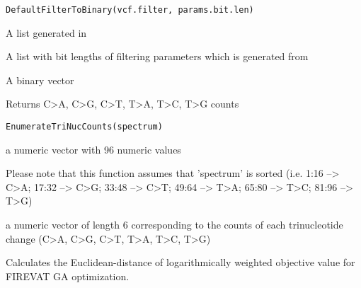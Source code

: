 \documentclass[letterpaper]{book}
\begin{document}
%
\begin{Usage}
\begin{verbatim}
DefaultFilterToBinary(vcf.filter, params.bit.len)
\end{verbatim}
\end{Usage}
%
\begin{Arguments}
\begin{ldescription}
\item[\code{vcf.filter}] A list generated in 

\item[\code{params.bit.len}] A list with bit lengths of filtering parameters which is generated from 
\end{ldescription}
\end{Arguments}
%
\begin{Value}
A binary vector
\end{Value}
%
\begin{Description}\relax
Returns C>A, C>G, C>T, T>A, T>C, T>G counts
\end{Description}
%
\begin{Usage}
\begin{verbatim}
EnumerateTriNucCounts(spectrum)
\end{verbatim}
\end{Usage}
%
\begin{Arguments}
\begin{ldescription}
\item[\code{spectrum}] a numeric vector with 96 numeric values
\end{ldescription}
\end{Arguments}
%
\begin{Details}\relax
Please note that this function assumes that 'spectrum' is sorted
(i.e. 1:16  --> C>A;
17:32 --> C>G;
33:48 --> C>T;
49:64 --> T>A;
65:80 --> T>C;
81:96 --> T>G)
\end{Details}
%
\begin{Value}
a numeric vector of length 6 corresponding to the counts of each trinucleotide change (C>A, C>G, C>T, T>A, T>C, T>G)
\end{Value}
%
\begin{Description}\relax
Calculates the Euclidean-distance of logarithmically weighted
objective value for FIREVAT GA optimization.
\end{Description}
\end{document}
